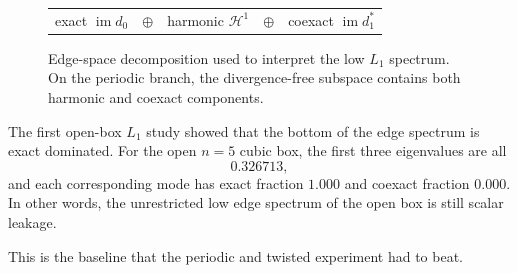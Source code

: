 \documentclass[11pt]{article}
\begin{document}
\begin{figure}[t]
\centering
\small
\setlength{\fboxsep}{6pt}
\begin{tabular}{c c c c c}
\fbox{\parbox{0.18\linewidth}{\centering exact\\$\operatorname{im} d_0$}} &
$\oplus$ &
\fbox{\parbox{0.18\linewidth}{\centering harmonic\\$\mathcal{H}^1$}} &
$\oplus$ &
\fbox{\parbox{0.18\linewidth}{\centering coexact\\$\operatorname{im} d_1^*$}}
\end{tabular}
\caption{Edge-space decomposition used to interpret the low $L_1$ spectrum. On the periodic branch, the divergence-free subspace contains both harmonic and coexact components.}
\label{fig:hodge-decomposition}
\end{figure}

The first open-box $L_1$ study showed that the bottom of the edge spectrum is exact dominated. For the open $n=5$ cubic box, the first three eigenvalues are all
\begin{equation}
0.326713,
\end{equation}
and each corresponding mode has exact fraction $1.000$ and coexact fraction $0.000$. In other words, the unrestricted low edge spectrum of the open box is still scalar leakage.

This is the baseline that the periodic and twisted experiment had to beat.
\end{document}

